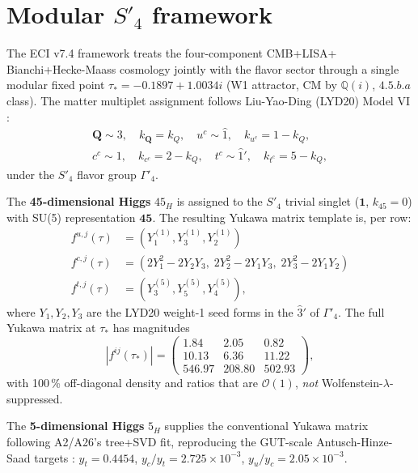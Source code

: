 \documentclass[reprint,prl,nofootinbib,floatfix,linenumbers]{revtex4-2}
\newcommand{\taustar}{\tau_*}
\begin{document}
\section{Modular $S'_4$ framework}
\label{sec:framework}

The ECI v7.4 framework \cite{ECIv74} treats the four-component CMB+LISA+
Bianchi+Hecke-Maass cosmology jointly with the flavor sector through a
single modular fixed point $\taustar=-0.1897+1.0034i$ (W1 attractor, CM by
$\mathbb{Q}(i)$, $4.5.b.a$ class). The matter multiplet assignment
follows Liu-Yao-Ding (LYD20) Model VI \cite{LiuYaoDing2020}:
\begin{align}
\bm{Q}\sim 3,\quad k_{\bm Q}=k_Q,\quad
u^c\sim \hat 1, \quad k_{u^c}=1-k_Q,\\
c^c\sim 1,\quad k_{c^c}=2-k_Q,\quad
t^c\sim\hat 1', \quad k_{t^c}=5-k_Q,
\end{align}
under the $S'_4$ flavor group $\Gamma'_4$.

The {\bf 45-dimensional Higgs} $45_H$ is assigned to the $S'_4$ trivial
singlet ($\bm{1}$, $k_{45}=0$) with SU(5) representation $\bm{45}$. The
resulting Yukawa matrix template is, per row:
\begin{align}
f^{u,j}(\tau) &= (Y^{(1)}_1, Y^{(1)}_3, Y^{(1)}_2)\\
f^{c,j}(\tau) &= (2Y_1^2-2Y_2Y_3,\; 2Y_2^2-2Y_1Y_3,\; 2Y_3^2-2Y_1Y_2)\\
f^{t,j}(\tau) &= (Y^{(5)}_3, Y^{(5)}_5, Y^{(5)}_4),
\end{align}
where $Y_1,Y_2,Y_3$ are the LYD20 weight-1 seed forms in the $\hat 3'$
of $\Gamma'_4$. The full Yukawa matrix at $\taustar$ has magnitudes
\begin{equation}
\label{eq:fmatrix}
|f^{ij}(\taustar)| = \begin{pmatrix} 1.84 & 2.05 & 0.82 \\
10.13 & 6.36 & 11.22\\
546.97 & 208.80 & 502.93\end{pmatrix},
\end{equation}
with 100\,\% off-diagonal density and ratios that are $\mathcal{O}(1)$,
{\em not} Wolfenstein-$\lambda$-suppressed.

The {\bf 5-dimensional Higgs} $5_H$ supplies the conventional Yukawa
matrix following A2/A26's tree+SVD fit, reproducing the GUT-scale
Antusch-Hinze-Saad targets \cite{AntuschHinzeSaad2025}: $y_t=0.4454$,
$y_c/y_t=2.725\times 10^{-3}$, $y_u/y_c=2.05\times 10^{-3}$.
\end{document}
